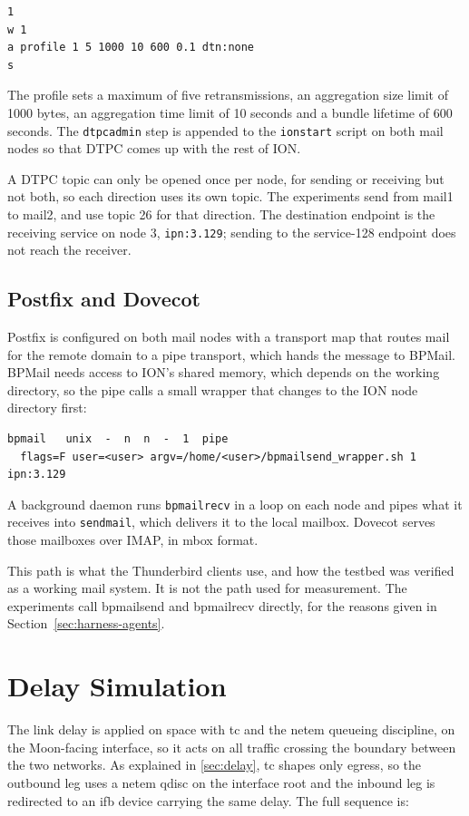 \begin{lstlisting}
1
w 1
a profile 1 5 1000 10 600 0.1 dtn:none
s
\end{lstlisting}

The profile sets a maximum of five retransmissions, an aggregation size limit of
1000 bytes, an aggregation time limit of 10 seconds and a bundle lifetime of 600
seconds. The \texttt{dtpcadmin} step is appended to the \texttt{ionstart} script on
both mail nodes so that DTPC comes up with the rest of ION.

A DTPC topic can only be opened once per node, for sending or receiving but not
both, so each direction uses its own topic. The experiments send from mail1 to
mail2, and use topic 26 for that direction. The destination endpoint is the
receiving service on node 3, \texttt{ipn:3.129}; sending to the service-128 endpoint
does not reach the receiver.

\subsection{Postfix and Dovecot}

Postfix is configured on both mail nodes with a transport map that routes mail for
the remote domain to a pipe transport, which hands the message to BPMail. BPMail
needs access to ION's shared memory, which depends on the working directory, so the
pipe calls a small wrapper that changes to the ION node directory first:

\begin{lstlisting}
bpmail   unix  -  n  n  -  1  pipe
  flags=F user=<user> argv=/home/<user>/bpmailsend_wrapper.sh 1 ipn:3.129
\end{lstlisting}

A background daemon runs \texttt{bpmailrecv} in a loop on each node and pipes what it
receives into \texttt{sendmail}, which delivers it to the local mailbox. Dovecot
serves those mailboxes over IMAP, in mbox format.

This path is what the Thunderbird clients use, and how the testbed was verified as a working mail system. It is not the path used for measurement. The experiments call bpmailsend and bpmailrecv directly, for the reasons given in Section~\ref{sec:harness-agents}.

\section{Delay Simulation}

The link delay is applied on space with tc and the netem queueing discipline, on the Moon-facing interface, so it acts on all traffic crossing the boundary between the two networks. As explained in \ref{sec:delay}, tc shapes only egress, so the outbound leg uses a netem qdisc on the interface root and the inbound leg is redirected to an ifb device carrying the same delay. The full sequence is:


